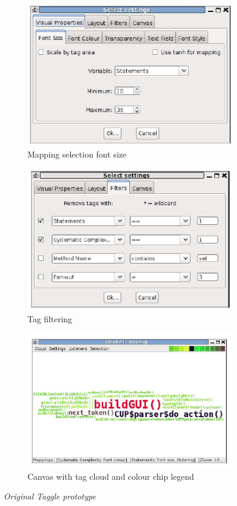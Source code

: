\begin{figure}[!htb]
\centering
\begin{subfigure}{.5\textwidth}
  \centering
  \includegraphics[scale=0.50]{old1.png}
  \caption{Mapping selection font size}
\end{subfigure}%
\begin{subfigure}{.5\textwidth}
  \centering
  \includegraphics[scale=0.50]{old2.png}
  \caption{Tag filtering}
\end{subfigure}
\begin{subfigure}{\textwidth}
  \centering
  \includegraphics[scale=0.80]{old3.png}
  \caption{Canvas with tag cloud and colour chip legend}
\end{subfigure}%
\caption{\textit{Original Taggle prototype}}
\label{fig:original}
\end{figure}

